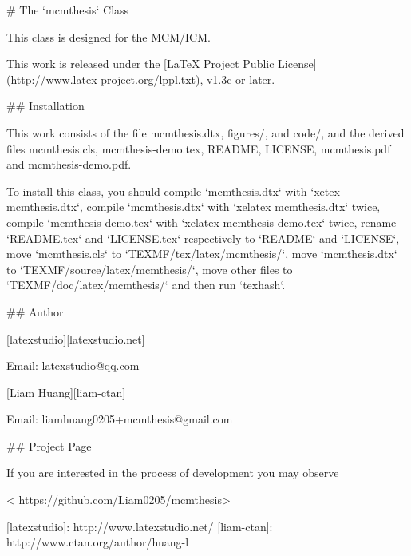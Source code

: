 # The `mcmthesis` Class

This class is designed for the MCM/ICM.

This work is released under the [LaTeX Project Public
License](http://www.latex-project.org/lppl.txt), v1.3c or later.

## Installation

This work consists of the file mcmthesis.dtx,
                               figures/, and
                               code/,
and the derived files          mcmthesis.cls,
                               mcmthesis-demo.tex,
                               README,
                               LICENSE,
                               mcmthesis.pdf and
                               mcmthesis-demo.pdf.

To install this class, you should
    compile `mcmthesis.dtx` with `xetex mcmthesis.dtx`,
    compile `mcmthesis.dtx` with `xelatex mcmthesis.dtx` twice,
    compile `mcmthesis-demo.tex` with `xelatex mcmthesis-demo.tex` twice,
    rename `README.tex` and `LICENSE.tex` respectively to
      `README` and `LICENSE`,
    move `mcmthesis.cls` to `TEXMF/tex/latex/mcmthesis/`,
    move `mcmthesis.dtx` to `TEXMF/source/latex/mcmthesis/`,
    move other files     to `TEXMF/doc/latex/mcmthesis/` and then
    run `texhash`.

## Author

[latexstudio][latexstudio.net]

Email: latexstudio@qq.com

[Liam Huang][liam-ctan]

Email: liamhuang0205+mcmthesis@gmail.com

## Project Page

If you are interested in the process of development you may observe

<
https://github.com/Liam0205/mcmthesis>

[latexstudio]: http://www.latexstudio.net/
[liam-ctan]: http://www.ctan.org/author/huang-l
